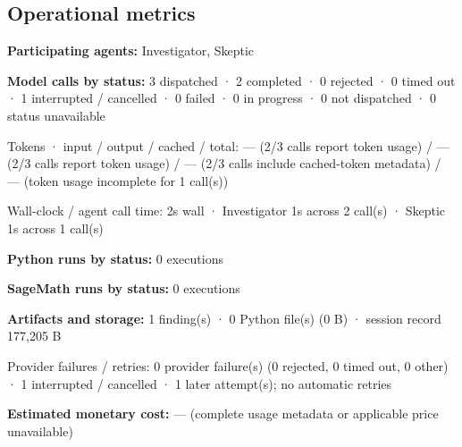 \documentclass[11pt]{article}
\begin{document}
\subsection{Operational metrics}
\textbf{Participating agents:} Investigator, Skeptic\par
\textbf{Model calls by status:} 3 dispatched · 2 completed · 0 rejected · 0 timed out · 1 interrupted / cancelled · 0 failed · 0 in progress · 0 not dispatched · 0 status unavailable\par
Tokens · input / output / cached / total: — (2/3 calls report token usage) / — (2/3 calls report token usage) / — (2/3 calls include cached-token metadata) / — (token usage incomplete for 1 call(s))\par
Wall-clock / agent call time: 2s wall · Investigator 1s across 2 call(s) · Skeptic 1s across 1 call(s)\par
\textbf{Python runs by status:} 0 executions\par
\textbf{SageMath runs by status:} 0 executions\par
\textbf{Artifacts and storage:} 1 finding(s) · 0 Python file(s) (0 B) · session record 177,205 B\par
Provider failures / retries: 0 provider failure(s) (0 rejected, 0 timed out, 0 other) · 1 interrupted / cancelled · 1 later attempt(s); no automatic retries\par
\textbf{Estimated monetary cost:} — (complete usage metadata or applicable price unavailable)\par
\end{document}
